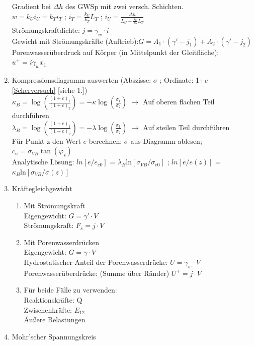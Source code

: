 \documentclass[fleqn,twoside]{article}
\begin{document}
\begin{enumerate}
		\hspace*{1cm} Gradient bei $\Delta h$ des GWSp mit zwei versch. Schichten.\\
		\hspace*{1cm} $w=k_U i_U = k_T i_T$ ; $i_T = \frac{k_U}{k_T} L_T$ ; $i_U = \frac{\Delta h}{L_U + \frac{k_U}{k_T}L_T}$\\
		Strömungskraftdichte: $j= \gamma_w \cdot i$\\
		Gewicht mit Strömungskräfte (Auftrieb):$G = A_1 \cdot (\gamma' - j_1) + A_2 \cdot (\gamma' - j_2)$\\
		Porenwasserüberdruck auf Körper (in Mittelpunkt der Gleitfläche): $u^+=i\gamma_wx_1$
\item Kompressionsdiagramm auswerten (Abszisse: $\sigma$ ; Ordinate: 1+$e$ \autoref{Scherversuch} [siehe 1.]) \\
		$\kappa_B = \log(\frac{(1+e)_1}{(1+e)_2}) = -\kappa \log(\frac{\sigma_1}{\sigma_2})$ $\rightarrow$ Auf oberen flachen Teil durchführen\\
		$\lambda_B = \log(\frac{(1+e)_1}{(1+e)_2}) = -\lambda \log(\frac{\sigma_1}{\sigma_2})$ $\rightarrow$ Auf steilen Teil durchführen\\
		Für Punkt z den Wert $e$ berechnen; $\sigma$ aus Diagramm ablesen; $c_u = \sigma_{VB} \tan(\varphi_s)$\\
		Analytische Lösung: $ln[e/e_{e0}]$ = $\lambda_B \text{ln}[\sigma_{VB} / \sigma_{e0}]$ ; 
							$ln[e/e(z)]$ = $\kappa_B \text{ln}[\sigma_{VB} / \sigma(z)]$ 
\item Kräftegleichgewicht
		\begin{enumerate}
		\item Mit Strömungskraft\\
				Eigengewicht: $G=\gamma' \cdot V$\\
				Strömungskraft: $F_s=j \cdot V$
		\item Mit Porenwasserdrücken\\
				Eigengewicht: $G=\gamma \cdot V$\\
				Hydrostatischer Anteil der Porenwasserdrücke: $U=\gamma_w \cdot V$\\
				Porenwasserüberdrücke: (Summe über Ränder) $U^+=j \cdot V$
		\item Für beide Fälle zu verwenden:\\
				Reaktionskräfte: Q\\
				Zwischenkräfte: $E_{12}$\\
				Äußere Belastungen\\
		\end{enumerate}
\item Mohr'scher Spannungskreis\label{Scherversuch}\\
		

\end{enumerate}
\end{document}
